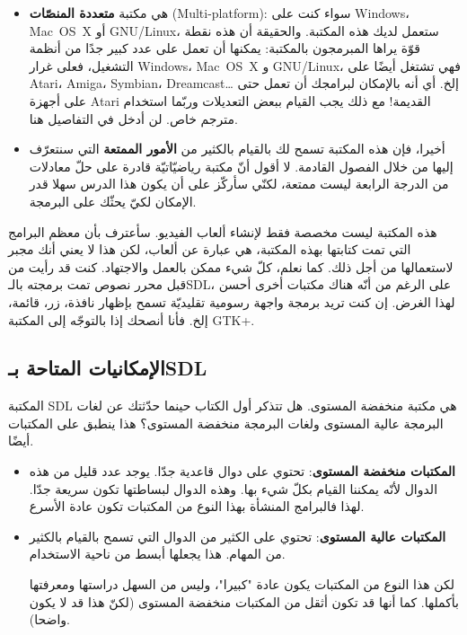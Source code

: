 \begin{itemize}
 	\item هي مكتبة
 	\textbf{متعددة المنصّات} 
 	(\textenglish{Multi-platform}):
 	سواء كنت على
 	\textenglish{Windows}،
 	\textenglish{\mbox{Mac OS X}}
 	أو
 	\textenglish{\mbox{GNU/Linux}}،
 	ستعمل لديك هذه المكتبة. والحقيقة أن هذه نقطة قوّة يراها المبرمجون بالمكتبة: يمكنها أن تعمل على عدد كبير جدًا من أنظمة التشغيل، فعلى غرار 
 	 	\textenglish{Windows}،
 	\textenglish{\mbox{Mac OS X}}
 	و
 	\textenglish{\mbox{GNU/Linux}}،
 	فهي تشتغل أيضًا على 
 	\textenglish{Atari}، \textenglish{Amiga}، \textenglish{Symbian}، \textenglish{Dreamcast}\dots
 	إلخ. أي أنه بالإمكان لبرامجك أن تعمل حتى على أجهزة 
 	\textenglish{Atari}
 	القديمة! مع ذلك يجب القيام ببعض التعديلات وربّما استخدام مترجم خاص. لن أدخل في التفاصيل هنا.
 	\item أخيرا، فإن هذه المكتبة تسمح لك بالقيام بالكثير من 
 	\textbf{الأمور الممتعة}
 	التي سنتعرّف إليها من خلال الفصول القادمة. لا أقول أنّ مكتبة رياضيّاتيّة قادرة على حلّ معادلات من الدرجة الرابعة ليست ممتعة، لكنّي سأركّز على أن يكون هذا الدرس سهلا قدر الإمكان لكيّ يحثّك على البرمجة.
\end{itemize}

هذه المكتبة ليست مخصصة فقط لإنشاء ألعاب الفيديو. سأعترف بأن معظم البرامج التي تمت كتابتها بهذه المكتبة، هي عبارة عن ألعاب، لكن هذا لا يعني أنك مجبر لاستعمالها من أجل ذلك. كما نعلم، كلّ شيء ممكن بالعمل والاجتهاد. كنت قد رأيت من قبل محرر نصوص تمت برمجته بالـ\textenglish{SDL}،
على الرغم من أنّه هناك مكتبات أخرى أحسن لهذا الغرض. إن كنت تريد برمجة واجهة رسومية تقليديّة تسمح بإظهار نافذة، زر، قائمة، إلخ. فأنا أنصحك إذا بالتوجّه إلى المكتبة 
\textenglish{GTK+}.

\subsection{الإمكانيات المتاحة بـ\textenglish{SDL}}

المكتبة
\textenglish{SDL}
هي مكتبة منخفضة المستوى. هل تتذكر أول الكتاب حينما حدّثتك عن لغات البرمجة عالية المستوى ولغات البرمجة منخفضة المستوى؟ هذا ينطبق على المكتبات أيضًا.

\begin{itemize}
	\item \textbf{المكتبات منخفضة المستوى}: 
	تحتوي على دوال قاعدية جدّا. يوجد عدد قليل من هذه الدوال لأنّه يمكننا القيام بكلّ شيء بها. وهذه الدوال لبساطتها تكون سريعة جدّا. لهذا فالبرامج المنشأة بهذا النوع من المكتبات تكون عادة الأسرع.
	\item \textbf{المكتبات عالية المستوى}: 
	تحتوي على الكثير من الدوال التي تسمح بالقيام بالكثير من المهام. هذا يجعلها أبسط من ناحية الاستخدام.
	
	لكن هذا النوع من المكتبات يكون عادة "كبيرا"، وليس من السهل دراستها ومعرفتها بأكملها. كما أنها قد تكون أثقل من المكتبات منخفضة المستوى (لكنّ هذا قد لا يكون واضحا).
\end{itemize}

